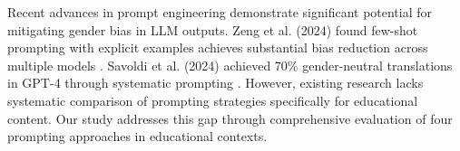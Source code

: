 Recent advances in prompt engineering demonstrate significant potential for mitigating gender bias in LLM outputs. Zeng et al. (2024) found few-shot prompting with explicit examples achieves substantial bias reduction across multiple models \cite{zeng2024debiasprompting}. Savoldi et al. (2024) achieved 70\% gender-neutral translations in GPT-4 through systematic prompting \cite{savoldi2024neutraltranslation}. However, existing research lacks systematic comparison of prompting strategies specifically for educational content. Our study addresses this gap through comprehensive evaluation of four prompting approaches in educational contexts.